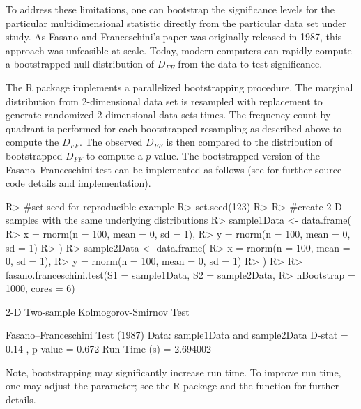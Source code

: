\documentclass[codesnippet]{jss}
\newcommand{\fct}[1]{\code{#1()}}
\begin{document}
To address these limitations, one can bootstrap the significance levels for the particular multidimensional statistic directly from the particular data set under study. As Fasano and Franceschini's paper was originally released in 1987, this approach was unfeasible at scale.  Today, modern computers can rapidly compute a bootstrapped null distribution of $D_{FF}$ from the data to test significance.

The  R package implements a parallelized bootstrapping procedure. The marginal distribution from 2-dimensional data set is resampled with replacement to generate randomized 2-dimensional data sets  times. The frequency count by quadrant is performed for each bootstrapped resampling as described above to compute the $D_{FF}$. The observed $D_{FF}$ is then compared to the distribution of bootstrapped $D_{FF}$ to compute a $p$-value. The bootstrapped version of the Fasano--Franceschini test can be implemented as follows (see \fct{fasano.franceschini.test} for further source code details and implementation).

\begin{CodeChunk}
\begin{CodeInput}
R> #set seed for reproducible example
R> set.seed(123)
R>
R> #create 2-D samples with the same underlying distributions
R> sample1Data <- data.frame(
R>  x = rnorm(n = 100, mean = 0, sd = 1),
R>  y = rnorm(n = 100, mean = 0, sd = 1)
R> )
R> sample2Data <- data.frame(
R>  x = rnorm(n = 100, mean = 0, sd = 1),
R>  y = rnorm(n = 100, mean = 0, sd = 1)
R> )
R>
R> fasano.franceschini.test(S1 = sample1Data, S2 = sample2Data,
R>                          nBootstrap = 1000, cores = 6)
\end{CodeInput}
\begin{CodeOutput}
      2-D Two-sample Kolmogorov-Smirnov Test

 Fasano--Franceschini Test (1987)
 Data:  sample1Data and sample2Data
 D-stat =  0.14 , p-value =  0.672
 Run Time (s) =  2.694002
\end{CodeOutput}
\end{CodeChunk}

Note, bootstrapping may significantly increase run time. To improve run time, one may adjust the  parameter; see the R  package and the \fct{mclapply} function for further details.
\end{document}
